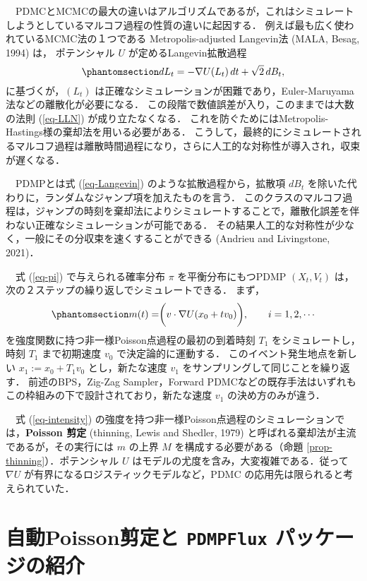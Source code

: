 \documentclass[
]{article}
\theoremstyle{StatementsWithUnderline}\newtheorem{theorem}{定理}[section]\newtheorem{definition}[theorem]{定義}\newtheorem{corollary}[theorem]{系}\newtheorem{proposition}[theorem]{命題}\newtheorem{lemma}[theorem]{補題}\newtheorem{example}[theorem]{例}
\theoremstyle{definition}\newtheorem{notation}[theorem]{記法}\newtheorem{algorithm}[theorem]{算譜}\newtheorem{remarks}[theorem]{要諦}\newtheorem{remark}[theorem]{注}
\begin{document}
　PDMCとMCMCの最大の違いはアルゴリズムであるが，これはシミュレートしようとしているマルコフ過程の性質の違いに起因する．
例えば最も広く使われているMCMC法の１つである Metropolis-adjusted
Langevin法 (MALA, Besag, 1994) は， ポテンシャル \(U\)
が定めるLangevin拡散過程
\begin{equation}\phantomsection\label{eq-Langevin}{
dL_t=-\nabla U(L_t)\,dt+\sqrt{2}\,dB_t,
}\end{equation} に基づくが，\((L_t)\)
は正確なシミュレーションが困難であり，Euler-Maruyama法などの離散化が必要になる．
この段階で数値誤差が入り，このままでは大数の法則 (\ref{eq-LLN})
が成り立たなくなる．
これを防ぐためにはMetropolis-Hastings様の棄却法を用いる必要がある．
こうして，最終的にシミュレートされるマルコフ過程は離散時間過程になり，さらに人工的な対称性が導入され，収束が遅くなる．

　PDMPとは式 (\ref{eq-Langevin}) のような拡散過程から，拡散項 \(dB_t\)
を除いた代わりに，ランダムなジャンプ項を加えたものを言う．
このクラスのマルコフ過程は，ジャンプの時刻を棄却法によりシミュレートすることで，離散化誤差を伴わない正確なシミュレーションが可能である．
その結果人工的な対称性が少なく，一般にその分収束を速くすることができる
(Andrieu and Livingstone, 2021)．

　式 (\ref{eq-pi}) で与えられる確率分布 \(\pi\) を平衡分布にもつPDMP
\((X_t,V_t)\) は，次の２ステップの繰り返しでシミュレートできる． まず，
\begin{equation}\phantomsection\label{eq-intensity}{
m(t)=\biggr(v\cdot\nabla U(x_0+tv_0)\biggl),\qquad i=1,2,\cdots
}\end{equation} を強度関数に持つ非一様Poisson点過程の最初の到着時刻
\(T_1\) をシミュレートし，時刻 \(T_1\) まで初期速度 \(v_0\)
で決定論的に運動する． このイベント発生地点を新しい \(x_1:=x_0+T_1v_0\)
とし，新たな速度 \(v_1\) をサンプリングして同じことを繰り返す．
前述のBPS，Zig-Zag Sampler，Forward
PDMCなどの既存手法はいずれもこの枠組みの下で設計されており，新たな速度
\(v_1\) の決め方のみが違う．

　式 (\ref{eq-intensity})
の強度を持つ非一様Poisson点過程のシミュレーションでは，\textbf{Poisson
剪定} (thinning, Lewis and Shedler, 1979)
と呼ばれる棄却法が主流であるが，その実行には \(m\) の上界 \(M\)
を構成する必要がある（命題 \ref{prop-thinning}）．ポテンシャル \(U\)
はモデルの尤度を含み，大変複雑である．従って\(\nabla U\)
が有界になるロジスティックモデルなど，PDMC
の応用先は限られると考えられていた．

\section{\texorpdfstring{自動Poisson剪定と \texttt{PDMPFlux}
パッケージの紹介}{自動Poisson剪定と PDMPFlux パッケージの紹介}}\label{sec-2}
\end{document}
